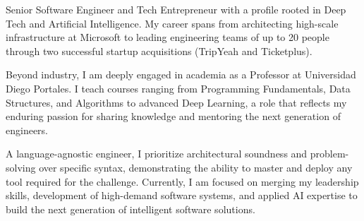

\begin{cvparagraph}
Senior Software Engineer and Tech Entrepreneur with a profile rooted in Deep Tech and Artificial Intelligence. My career spans from architecting high-scale infrastructure at Microsoft to leading engineering teams of up to 20 people through two successful startup acquisitions (TripYeah and Ticketplus).

Beyond industry, I am deeply engaged in academia as a Professor at Universidad Diego Portales. I teach courses ranging from Programming Fundamentals, Data Structures, and Algorithms to advanced Deep Learning, a role that reflects my enduring passion for sharing knowledge and mentoring the next generation of engineers.

A language-agnostic engineer, I prioritize architectural soundness and problem-solving over specific syntax, demonstrating the ability to master and deploy any tool required for the challenge. Currently, I am focused on merging my leadership skills, development of high-demand software systems, and applied AI expertise to build the next generation of intelligent software solutions.

\end{cvparagraph}
